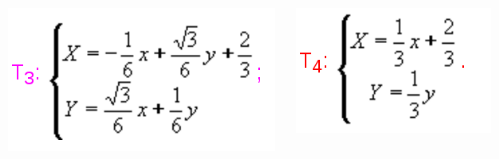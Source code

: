 \documentclass{beamer}
\begin{document}
\begin{frame}
\begin{columns}
\begin{column}{0.25\textwidth}
\begin{center}
					\end{center}
				\end{column}
				\begin{column}{0.25\textwidth}
					\begin{center}
						\includegraphics[width=1\linewidth]{"../Curva di Koch/t3"}
					\end{center}
				\end{column}
				\begin{column}{0.25\textwidth}
					\begin{center}
						\includegraphics[width=1\linewidth]{"../Curva di Koch/t4"}
					\end{center}
				\end{column}
			\end{columns}
		\end{frame}
\end{document}
